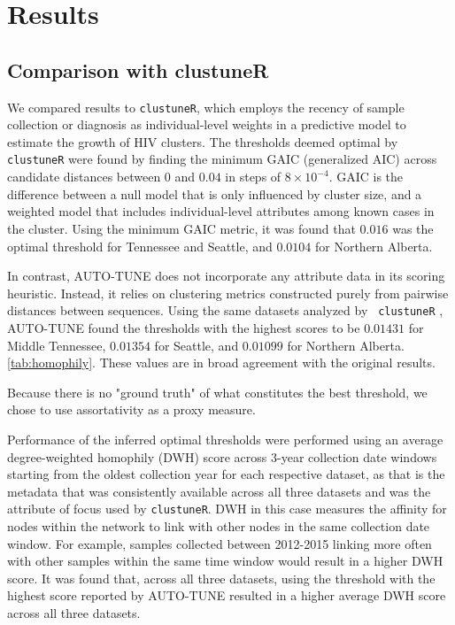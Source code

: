 \documentclass[utf8]{FrontiersinHarvard} %
\newcommand{\TODO}[1]{{\color{red}{#1}}}
\begin{document}
\section{Results}

\subsection{Comparison with clustuneR}

We compared results to {\tt clustuneR}, which employs the recency of sample
collection or diagnosis as individual-level weights in a predictive model to
estimate the growth of HIV clusters. The thresholds deemed optimal by {\tt
		clustuneR} were found by finding the minimum GAIC (generalized AIC) across
candidate distances between $0$ and $0.04$ in steps of $8 \times 10^{-4}$. GAIC
is the difference between a null model that is only influenced by cluster size,
and a weighted model that includes individual-level attributes among known
cases in the cluster. Using the minimum GAIC metric, it was found that $0.016$
was the optimal threshold for Tennessee and Seattle, and $0.0104$ for Northern
Alberta.

In contrast, AUTO-TUNE does not incorporate any attribute data in its scoring
heuristic. Instead, it relies on clustering metrics constructed purely from
pairwise distances between sequences. Using the same datasets analyzed by {\tt
		clustuneR} \citep{chato_public_2020}, AUTO-TUNE found the thresholds with the
highest scores to be $0.01431$ for Middle Tennessee, $0.01354$ for Seattle, and
$0.01099$ for Northern Alberta. \autoref{tab:homophily}. These values are in
broad agreement with the original results.

\TODO{discuss how our thresholds perform vs the published thresholds; look at the GAIC plots}

Because there is no "ground truth" of what constitutes the best threshold, we
chose to use assortativity as a proxy measure. \TODO{this may need more
	justification}

Performance of the inferred optimal thresholds were performed using an average
degree-weighted homophily (DWH) score across 3-year collection date windows
starting from the oldest collection year for each respective dataset, as that
is the metadata that was consistently available across all three datasets and
was the attribute of focus used by {\tt clustuneR}. DWH in this case measures
the affinity for nodes within the network to link with other nodes in the same
collection date window. For example, samples collected between 2012-2015
linking more often with other samples within the same time window would result
in a higher DWH score. It was found that, across all three datasets, using the
threshold with the highest score reported by AUTO-TUNE resulted in a higher
average DWH score across all three datasets. \TODO{compared to what?}
\end{document}
